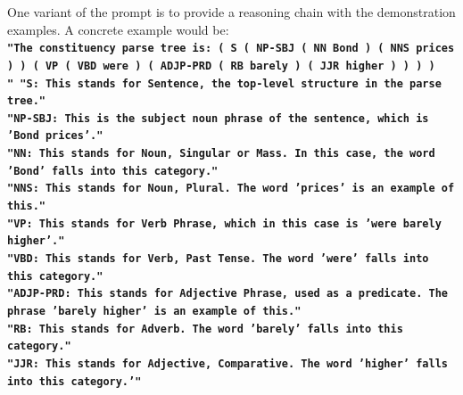 One variant of the prompt is to provide a reasoning chain with the demonstration examples.
A concrete example would be: \\
\textbf{\texttt{"The constituency parse tree is: ( S ( NP-SBJ ( NN Bond ) ( NNS prices ) ) ( VP ( VBD were ) ( ADJP-PRD ( RB barely ) ( JJR higher ) ) ) )\\"
                  "S: This stands for Sentence, the top-level structure in the parse tree."\\
                  "NP-SBJ: This is the subject noun phrase of the sentence, which is 'Bond prices'."\\
                  "NN: This stands for Noun, Singular or Mass. In this case, the word 'Bond' falls into this category."\\
                  "NNS: This stands for Noun, Plural. The word 'prices' is an example of this."\\
                  "VP: This stands for Verb Phrase, which in this case is 'were barely higher'."\\
                  "VBD: This stands for Verb, Past Tense. The word 'were' falls into this category."\\
                  "ADJP-PRD: This stands for Adjective Phrase, used as a predicate. The phrase 'barely higher' is an example of this."\\
                  "RB: This stands for Adverb. The word 'barely' falls into this category."\\
                  "JJR: This stands for Adjective, Comparative. The word 'higher' falls into this category.'"}}